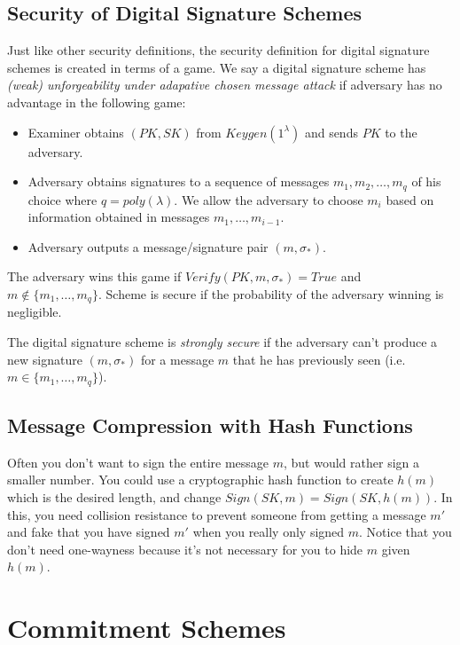 \documentclass[psamsfonts]{amsart}
\begin{document}
\subsection{Security of Digital Signature Schemes}

Just like other security definitions, the security definition for digital signature schemes is created in terms of a game. We say a digital signature scheme has \emph{(weak) unforgeability under adapative chosen message attack} if adversary has no advantage in the following game:
\begin{itemize}
  \item Examiner obtains $(PK, SK)$ from $Keygen(1^{\lambda})$ and sends $PK$ to the adversary.
  \item Adversary obtains signatures to a sequence of messages $m_1, m_2, \ldots, m_q$ of his choice where $q = poly(\lambda)$. We allow the adversary to choose $m_i$ based on information obtained in messages $m_1, \ldots, m_{i-1}$.
  \item Adversary outputs a message/signature pair $(m, \sigma_*)$.
\end{itemize}

The adversary wins this game if $Verify(PK, m, \sigma_*) = True$ and $m \not \in \{m_1, \ldots, m_q \}$. Scheme is secure if the probability of the adversary winning is negligible.

The digital signature scheme is \emph{strongly secure} if the adversary can't produce a new signature $(m, \sigma_*)$ for a message $m$ that he has previously seen (i.e. $m \in \{m_1, \ldots, m_q\}$).

\subsection{Message Compression with Hash Functions}

Often you don't want to sign the entire message $m$, but would rather sign a smaller number. You could use a cryptographic hash function to create $h(m)$ which is the desired length, and change $Sign(SK, m) = Sign(SK, h(m))$. In this, you need collision resistance to prevent someone from getting a message $m'$ and fake that you have signed $m'$ when you really only signed $m$. Notice that you don't need one-wayness because it's not necessary for you to hide $m$ given $h(m)$.

\newpage

\section{Commitment Schemes}
\end{document}
